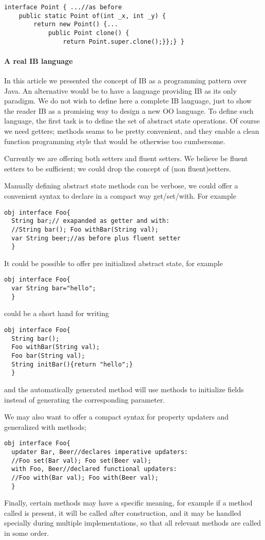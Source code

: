 \begin{lstlisting}
interface Point { ...//as before
    public static Point of(int _x, int _y) {
        return new Point() {...
            public Point clone() {
                return Point.super.clone();}};} }
\end{lstlisting}

\paragraph{A real IB language}
In this article we presented the concept of IB as a programming pattern over Java.
An alternative would be to have a language providing IB as its only paradigm.
We do not wish to define here a complete IB language, just to show the reader IB as
a promising way to design a new OO language.
To define such language, the first task is to define the set of abstract state operations.
Of course we need getters; \Q@withX@ methods seams to be pretty convenient, and they enable a
clean function programming style that would be otherwise too cumbersome.

Currently we are offering both setters and fluent setters.
We believe be fluent setters to be sufficient; we could drop the concept of (non fluent)setters.

Manually defining abstract state methods can be verbose, we could offer a convenient syntax to
declare in a compact way get/set/with.
For example
\begin{lstlisting}
obj interface Foo{
  String bar;// exapanded as getter and with:
  //String bar(); Foo withBar(String val);
  var String beer;//as before plus fluent setter
  }
\end{lstlisting}

It could be possible to offer pre initialized abstract state, for example
\begin{lstlisting}
obj interface Foo{
  var String bar="hello";
  }
\end{lstlisting}

could be a short hand for writing

\begin{lstlisting}
obj interface Foo{
  String bar();
  Foo withBar(String val);
  Foo bar(String val);
  String initBar(){return "hello";}
  }
\end{lstlisting}
and the automatically generated \Q@of@ method will use \Q@initX@ methods to initialize fields
instead of generating the corresponding parameter.


We may also want to offer a compact syntax for property updaters and generalized with methods;
\begin{lstlisting}
obj interface Foo{
  updater Bar, Beer//declares imperative updaters:
  //Foo set(Bar val); Foo set(Beer val);
  with Foo, Beer//declared functional updaters:
  //Foo with(Bar val); Foo with(Beer val);
  }
\end{lstlisting}
Finally, certain methods may have a specific meaning, for example
if a method called \Q@postInit@ is present, it will be called after construction,
and it may be handled specially during multiple implementations, so that all relevant \Q@postInit@ methods are
called in some order.
